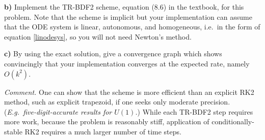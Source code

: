 \documentclass[12pt]{amsart}
\newcommand{\epart}[1]{\medskip\noindent\textbf{#1)}\quad }
\begin{document}
\epart{b}  Implement the TR-BDF2 scheme, equation (8.6) in the textbook, for this problem.  Note that the scheme is implicit but your implementation can assume that the ODE system is linear, autonomous, and homogeneous, i.e.~in the form of equation \eqref{linodesys}, so you will not need Newton's method.

\epart{c}  By using the exact solution, give a convergence graph which shows convincingly that your implementation converges at the expected rate, namely $O(k^2)$.

\medskip
\noindent  \emph{Comment.}  One can show that the scheme is more efficient than an explicit RK2 method, such as explicit trapezoid, if one seeks only moderate precision.  (\emph{E.g.~five-digit-accurate results for $U(1)$.})  While each TR-BDF2 step requires more work, because the problem is reasonably stiff, application of conditionally-stable RK2 requires a much larger number of time steps.
\end{document}
